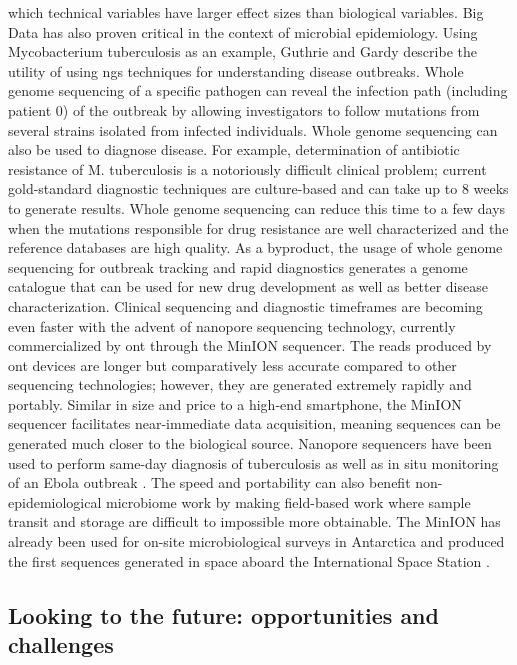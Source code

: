 which technical variables have larger effect sizes than biological variables.
Big Data has also proven critical in the context of microbial epidemiology. Using
Mycobacterium tuberculosis as an example, Guthrie and Gardy \cite{Guthrie2017}
describe the utility of using \gls{ngs} techniques for understanding disease
outbreaks. Whole genome sequencing of a specific pathogen can reveal the infection
path (including patient 0) of the outbreak by allowing investigators to follow
mutations from several strains isolated from infected individuals. Whole genome
sequencing can also be used to diagnose disease. For example, determination of
antibiotic resistance of M. tuberculosis is a notoriously difficult clinical
problem; current gold-standard diagnostic techniques are culture-based and can
take up to 8 weeks to generate results. Whole genome sequencing can reduce this
time to a few days when the mutations responsible for drug resistance are well
characterized and the reference databases are high quality. As a byproduct, the
usage of whole genome sequencing for outbreak tracking and rapid diagnostics
generates a genome catalogue that can be used for new drug development as well as
better disease characterization. Clinical sequencing and diagnostic timeframes
are becoming even faster with the advent of nanopore sequencing technology,
currently commercialized by \gls{ont} through the MinION sequencer. The reads
produced by \gls{ont} devices are longer but comparatively less accurate compared
to other sequencing technologies; however, they are generated extremely rapidly
and portably. Similar in size and price to a high-end smartphone, the MinION
sequencer facilitates near-immediate data acquisition, meaning sequences can be
generated much closer to the biological source. Nanopore sequencers have been
used to perform same-day diagnosis of tuberculosis \cite{Votintseva2017} as well
as in situ monitoring of an Ebola outbreak \cite{Quick2016}. The speed and
portability can also benefit non-epidemiological microbiome work by making
field-based work where sample transit and storage are difficult to impossible
more obtainable. The MinION has already been used for on-site microbiological
surveys in Antarctica \cite{Johnson2017} and produced the first sequences
generated in space aboard the International Space Station \cite{Castro-Wallace2016}.

\subsection{Looking to the future: opportunities and challenges}

